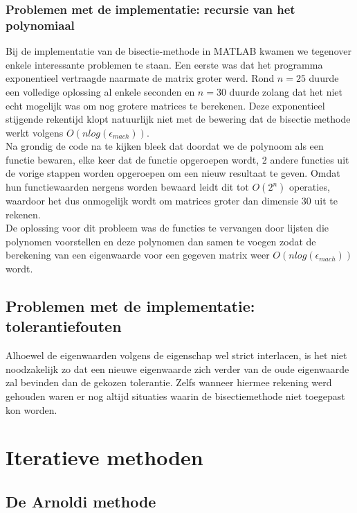 \documentclass[a4paper]{article}
\begin{document}
\subsubsection{Problemen met de implementatie: recursie van het polynomiaal}
Bij de implementatie van de bisectie-methode in MATLAB kwamen we tegenover enkele interessante problemen te staan. Een eerste was dat het programma exponentieel vertraagde naarmate de matrix groter werd. Rond $n=25$ duurde een volledige oplossing al enkele seconden en $n=30$ duurde zolang dat het niet echt mogelijk was om nog grotere matrices te berekenen. Deze exponentieel stijgende rekentijd klopt natuurlijk niet met de bewering dat de bisectie methode werkt volgens $O(nlog(\epsilon_{mach}))$. \\
Na grondig de code na te kijken bleek dat doordat we de polynoom als een functie bewaren, elke keer dat de functie opgeroepen wordt, 2 andere functies uit de vorige stappen worden opgeroepen om een nieuw resultaat te geven. Omdat hun functiewaarden nergens worden bewaard leidt dit tot $O(2^{n})$ operaties, waardoor het dus onmogelijk wordt om matrices groter dan dimensie 30 uit te rekenen. \\
De oplossing voor dit probleem was de functies te vervangen door lijsten die polynomen voorstellen en deze polynomen dan samen te voegen zodat de berekening van een eigenwaarde voor een gegeven matrix weer $O(nlog(\epsilon_{mach}))$ wordt.
\subsection{Problemen met de implementatie: tolerantiefouten}
Alhoewel de eigenwaarden volgens de eigenschap wel strict interlacen, is het niet noodzakelijk zo dat een nieuwe eigenwaarde zich verder van de oude eigenwaarde zal bevinden dan de gekozen tolerantie. Zelfs wanneer hiermee rekening werd gehouden waren er nog altijd situaties waarin de bisectiemethode niet toegepast kon worden.


\section{Iteratieve methoden}
\subsection{De Arnoldi methode}
\end{document}
